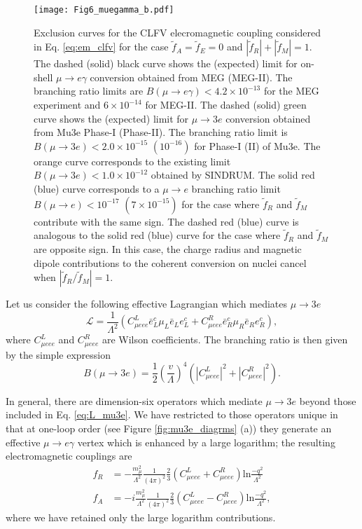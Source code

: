 \documentclass{book}[letterpaper,12pt]
\begin{document}
\begin{figure}
\centering
\texttt{[image: Fig6\_muegamma\_b.pdf]}
\caption{Exclusion curves for the CLFV elecromagnetic coupling considered in Eq. \ref{eq:em_clfv} for the case $\tilde{f}_A=\tilde{f}_E=0$ and $|\tilde{f}_R|+|\tilde{f}_M|=1$. The dashed (solid) black curve shows the (expected) limit for on-shell $\mu\rightarrow e\gamma$ conversion obtained from MEG (MEG-II). The branching ratio limits are $B(\mu\rightarrow e\gamma)<4.2\times 10^{-13}$ for the MEG experiment and $6\times 10^{-14}$ for MEG-II. The dashed (solid) green curve shows the (expected) limit for $\mu\rightarrow 3e$ conversion obtained from Mu3e Phase-I (Phase-II). The branching ratio limit is $B(\mu\rightarrow 3e)<2.0\times 10^{-15}$ $(10^{-16})$ for Phase-I (II)  of Mu3e. The orange curve corresponds to the existing limit $B(\mu\rightarrow 3e)<1.0\times 10^{-12}$ obtained by SINDRUM. The solid red (blue) curve corresponds to a $\mu\rightarrow e$ branching ratio limit $B(\mu\rightarrow e)<10^{-17}$ $(7\times 10^{-15})$ for the case where $\tilde{f}_R$ and $\tilde{f}_M$ contribute with the same sign. The dashed red (blue) curve is analogous to the solid red (blue) curve for the case where $\tilde{f}_R$ and $\tilde{f}_M$ are opposite sign. In this case, the charge radius and magnetic dipole contributions to the coherent conversion on nuclei cancel when $|\tilde{f}_R/\tilde{f}_M|=1$.}
\label{fig:mu2e_meg_mu3e}
\end{figure}

Let us consider the following effective Lagrangian which mediates $\mu\rightarrow 3e$
\begin{equation}
\mathcal{L}=\frac{1}{\Lambda^2}\left(C_{\mu eee}^L\bar{e}^c_L\mu_L\bar{e}_Le^c_L+C^R_{\mu eee}\bar{e}^c_R\mu_R\bar{e}_Re^c_R\right),
\label{eq:L_mu3e}
\end{equation}
where $C^L_{\mu eee}$ and $C^R_{\mu eee}$ are Wilson coefficients. The branching ratio is then given by the simple expression
\begin{equation}
B(\mu\rightarrow 3e)=\frac{1}{2}\left(\frac{v}{\Lambda}\right)^4\left(|C^L_{\mu eee}|^2+|C^R_{\mu eee}|^2\right).
\end{equation}

In general, there are dimension-six operators which mediate $\mu\rightarrow 3e$ beyond those included in Eq. \ref{eq:L_mu3e}. We have restricted to those operators unique in that at one-loop order (see Figure \ref{fig:mu3e_diagrms} (a)) they generate an effective $\mu\rightarrow e\gamma$ vertex which is enhanced by a large logarithm; the resulting electromagnetic couplings are \cite{Raidal:1997hq,Cirigliano:2004mv,PhysRevLett.93.231802}
\begin{equation}
\begin{split}
f_R&=-\frac{m_{\mu}^2}{\Lambda^2}\frac{1}{(4\pi)^2}\frac{2}{3}\left(C^L_{\mu eee}+C^R_{\mu eee}\right)\mathrm{ln}\frac{-q^2}{\Lambda^2}\\
f_A&=-i\frac{m_{\mu}^2}{\Lambda^2}\frac{1}{(4\pi)^2}\frac{2}{3}\left(C^L_{\mu eee}-C^R_{\mu eee}\right)\mathrm{ln}\frac{-q^2}{\Lambda^2},
\end{split}
\end{equation}
where we have retained only the large logarithm contributions.
\end{document}
